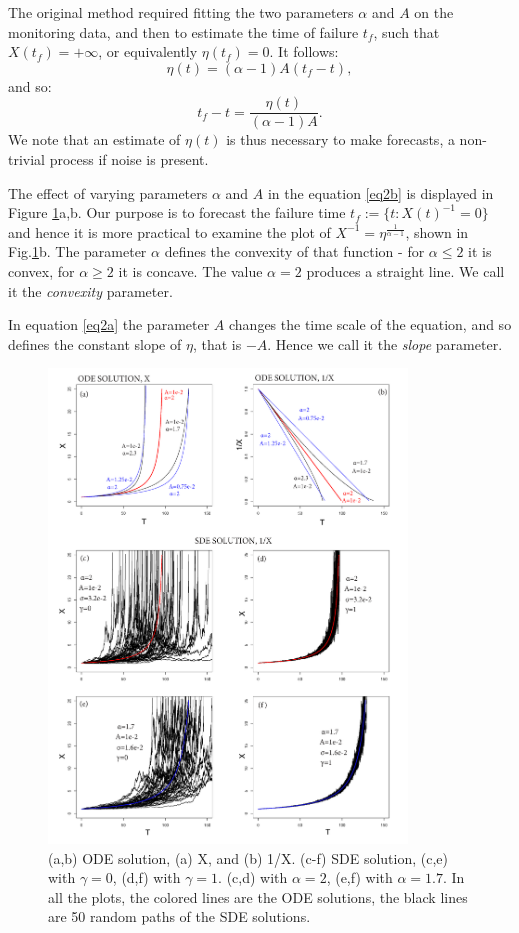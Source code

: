 \documentclass{article}
\begin{document}
The original method required fitting the two parameters $\alpha$ and $A$ on the monitoring data, and then to estimate the time of failure $t_f$, such that $X(t_f) =+\infty$, or equivalently $\eta(t_f)=0$. It follows:
$$\eta(t)=(\alpha-1)A(t_f-t),$$
and so:
$$t_f-t=\frac{\eta(t)}{(\alpha-1)A}.$$
We note that an estimate of $\eta(t)$ is thus necessary to make forecasts, a non-trivial process if noise is present.

The effect of varying parameters $\alpha$ and $A$ in the equation \ref{eq2b} is displayed in Figure \ref{Fig1}a,b. Our purpose is to forecast the failure time $t_f:=\{t:X(t)^{-1}=0\}$ and hence it is more practical to examine the plot of $X^{-1}=\eta^{\frac{1}{\alpha-1}}$, shown in Fig.\ref{Fig1}b. The parameter $\alpha$ defines the convexity of that function - for $\alpha\le2$ it is convex, for $\alpha\ge2$ it is concave. The value $\alpha=2$ produces a straight line. We call it the {\it convexity} parameter.

In equation \ref{eq2a} the parameter $A$ changes the time scale of the equation, and so defines the constant slope of $\eta$, that is $-A$. Hence we call it the {\it slope} parameter.

\begin{figure}[H]
\centering
\includegraphics[width=0.85\textwidth]{Fig1_plus.png}
\caption{(a,b) ODE solution, (a) X, and (b) 1/X. (c-f) SDE solution, (c,e) with $\gamma=0$, (d,f) with $\gamma=1$. (c,d) with $\alpha=2$, (e,f) with $\alpha=1.7$. In all the plots, the colored lines are the ODE solutions, the black lines are 50 random paths of the SDE solutions.}
\label{Fig1}
\end{figure}
\end{document}
